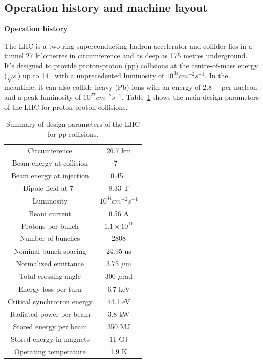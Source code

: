 \subsection{Operation history and machine layout}

\textbf{Operation history}

The LHC \cite{Bruning:2004ej, Buning:2004wk, Benedikt:2004wm, Evans_2008} 
is a two-ring-superconducting-hadron accelerator and collider lies in a tunnel 27 kilometres in circumference and as deep as 175 metres underground.
It's designed to provide proton-proton (pp) collisions at the centre-of-mass energy ($\sqrt{s}$) up to 14~\tev
with a unprecedented luminosity of $10^{34} cm^{-2} s^{-1}$.
In the meantime, it can also collide heavy (Pb) ions with an energy of 2.8~\tev~ per nucleon and a peak luminosity of $10^{27} cm^{-2} s^{-1}$.
Table~\ref{tab:LHC_parameters} shows the main design parameters of the LHC for proton-proton collisions.
\begin{table}[htbp]
  \centering
  \caption{Summary of design parameters of the LHC for pp collisions.}
  \label{tab:LHC_parameters}
  \begin{tabular}{cc}
    \hline
    Circumference	& 26.7 km\\
    Beam energy at collision	& 7 ~\tev\\
    Beam energy at injection	& 0.45~\tev \\
    Dipole field at 7~\tev	& 8.33 T \\
    Luminosity		& $10^{34} cm^{-2} s^{-1}$ \\
    Beam current	& 0.56 A \\
    Protons per bunch	& $1.1 \times 10^{11}$ \\
    Number of bunches	& 2808 \\
    Nominal bunch spacing	& 24.95 ns \\
    Normalized emittance	& 3.75 $\mu$m \\
    Total crossing angle	& 300 $\mu$rad \\
    Energy loss per turn	& 6.7 keV \\
    Critical synchrotron energy	& 44.1 eV \\
    Radiated power per beam	& 3.8 kW \\
    Stored energy per beam	& 350 MJ \\
    Stored energy in magnets	& 11 GJ \\
    Operating temperature	& 1.9 K \\
    \hline
  \end{tabular}
\end{table}

